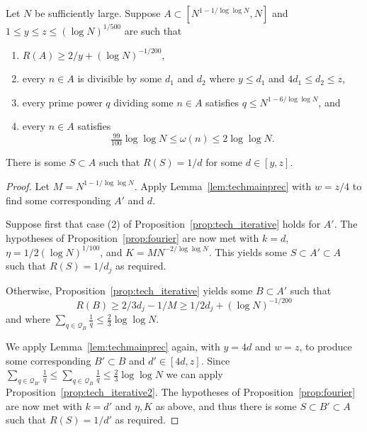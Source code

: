 \begin{proposition}\label{prop:techmain}
\leanok
{}
Let $N$ be sufficiently large. Suppose $A\subset [N^{1-1/\log\log N},N]$ and $1\leq y\leq z\leq (\log N)^{1/500}$ are such that
\begin{enumerate}
\item $R(A)\geq 2/y+(\log N)^{-1/200}$,
\item every $n\in A$ is divisible by some $d_1$ and $d_2$ where $y\leq d_1$ and $4d_1\leq d_2\leq z$,
\item every prime power $q$ dividing some $n\in A$ satisfies $q\leq N^{1-6/\log\log N}$, and
\item every $n\in A$ satisfies
\[\tfrac{99}{100}\log\log N\leq \omega(n) \leq 2\log\log N.\]
\end{enumerate}
There is some $S\subset A$ such that $R(S)=1/d$ for some $d\in [y,z]$.
\end{proposition}
\begin{proof}
Let $M=N^{1-1/\log\log N}$. Apply Lemma~\ref{lem:techmainprec} with $w=z/4$ to find some corresponding $A'$ and $d$.  

Suppose first that case (2) of Proposition~\ref{prop:tech_iterative} holds for $A'$. The hypotheses of Proposition~\ref{prop:fourier} are now met with $k=d$, $\eta=1/2(\log N)^{1/100}$, and $K=MN^{-2/\log \log N}$. This yields some $S\subset A'\subset A$ such that $R(S)=1/d_j$ as required.

Otherwise, Proposition~\ref{prop:tech_iterative} yields some $B\subset A'$ such that
\[R(B)\geq 2/3d_j-1/M\geq 1/2d_j+(\log N)^{-1/200}\]
and where $\sum_{q\in\mathcal{Q}_B}\frac{1}{q}\leq \frac{2}{3}\log\log N$. 

We apply Lemma~\ref{lem:techmainprec} again, with $y=4d$ and $w=z$, to produce some corresponding $B'\subset B$ and $d'\in [4d,z]$. Since $\sum_{q\in \mathcal{Q}_{B'}}\frac{1}{q}\leq \sum_{q\in\mathcal{Q}_B}\frac{1}{q}\leq \frac{2}{3}\log\log N$ we can apply Proposition~\ref{prop:tech_iterative2}. The hypotheses of Proposition~\ref{prop:fourier} are now met with $k=d'$ and $\eta,K$ as above, and thus there is some $S\subset B'\subset A$ such that $R(S)=1/d'$ as required. 
\end{proof}
